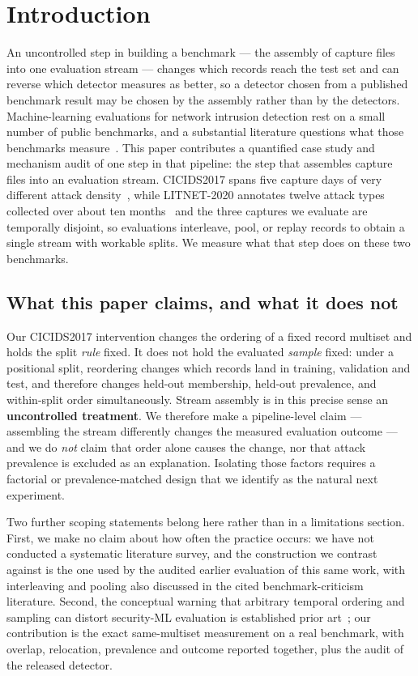 \documentclass[manuscript,screen,nonacm]{acmart}
\begin{document}
\section{Introduction}
\label{sec:intro}

An uncontrolled step in building a benchmark --- the assembly of capture files
into one evaluation stream --- changes which records reach the test set and can
reverse which detector measures as better, so a detector chosen from a published
benchmark result may be chosen by the assembly rather than by the detectors.
Machine-learning evaluations for network intrusion detection rest on a small
number of public benchmarks, and a substantial literature questions what those
benchmarks measure~\citep{catillo2023hype,arp2022dosdonts,ring2019datasets}.
This paper contributes a quantified case study and mechanism audit of one step
in that pipeline: the step that assembles capture files into an evaluation
stream. CICIDS2017 spans five capture days of very different attack
density~\citep{sharafaldin2018cicids,engelen2021cicids}, while LITNET-2020
annotates twelve attack types collected over about ten
months~\citep{damasevicius2020litnet} and the three captures we evaluate are
temporally disjoint, so evaluations
interleave, pool, or replay records to obtain a single stream with workable
splits. We measure what that step does on these two benchmarks.

\subsection*{What this paper claims, and what it does not}
Our CICIDS2017 intervention changes the ordering of a fixed record multiset and
holds the split \emph{rule} fixed. It does not hold the evaluated \emph{sample}
fixed: under a positional split, reordering changes which records land in
training, validation and test, and therefore changes held-out membership,
held-out prevalence, and within-split order simultaneously. Stream assembly is
in this precise sense an \textbf{uncontrolled treatment}. We therefore make a
pipeline-level claim --- assembling the stream differently changes the measured
evaluation outcome --- and we do \emph{not} claim that order alone causes the
change, nor that attack prevalence is excluded as an explanation. Isolating
those factors requires a factorial or prevalence-matched design that we
identify as the natural next experiment.

Two further scoping statements belong here rather than in a limitations
section. First, we make no claim about how often the practice occurs: we have
not conducted a systematic literature survey, and the construction we contrast
against is the one used by the audited earlier evaluation of this same work,
with interleaving and pooling also discussed in the cited benchmark-criticism
literature. Second, the conceptual warning that arbitrary temporal ordering and
sampling can distort security-ML evaluation is established prior
art~\citep{catillo2023hype,arp2022dosdonts}; our contribution is the exact
same-multiset measurement on a real benchmark, with overlap, relocation,
prevalence and outcome reported together, plus the audit of the released
detector.
\end{document}
